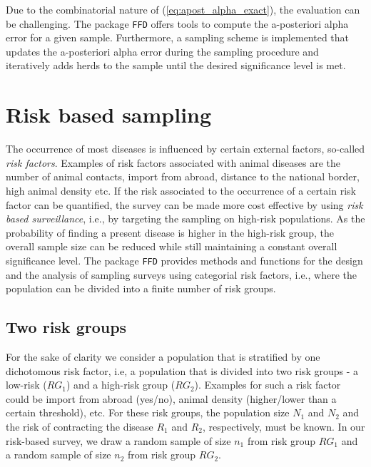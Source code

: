 \documentclass[nojss]{jss}
\begin{document}
Due to the combinatorial nature of (\ref{eq:apost_alpha_exact}), the evaluation can be challenging. The package \texttt{FFD} offers tools to compute the a-posteriori alpha error for a given sample. Furthermore, a sampling scheme is implemented that updates the a-posteriori alpha error during the sampling procedure and iteratively adds herds to the sample until the desired significance level is met.


\section{Risk based sampling} \label{sec:riskbased}

The occurrence of most diseases is influenced by certain external factors, so-called \emph{risk factors}. Examples of risk factors associated with animal diseases are the number of animal contacts, import from abroad, distance to the national border, high animal density etc. If the risk associated to the occurrence of a certain risk factor can be quantified, the survey can be made more cost effective by using \emph{risk based surveillance}, i.e., by targeting the sampling on high-risk populations. As the probability of finding a present disease is higher in the high-risk group, the overall sample size can be reduced while still maintaining a constant overall significance level. The package \texttt{FFD} provides methods and functions for the design and the analysis of sampling surveys using categorial risk factors, i.e., where the population can be divided into a finite number of risk groups.

%

\subsection{Two risk groups}

For the sake of clarity we consider a population that is stratified by one dichotomous risk factor, i.e, a population that is divided into two risk groups - a low-risk ($RG_1$) and a high-risk group ($RG_2$). Examples for such a risk factor could be import from abroad (yes/no), animal density (higher/lower than a certain threshold), etc. For these risk groups, the population size $N_1$ and $N_2$ and the risk of contracting the disease $R_1$ and $R_2$, respectively, must be known. In our risk-based survey, we draw a random sample of size $n_1$ from risk group $RG_1$ and a random sample of size $n_2$ from risk group $RG_2$.
\end{document}
